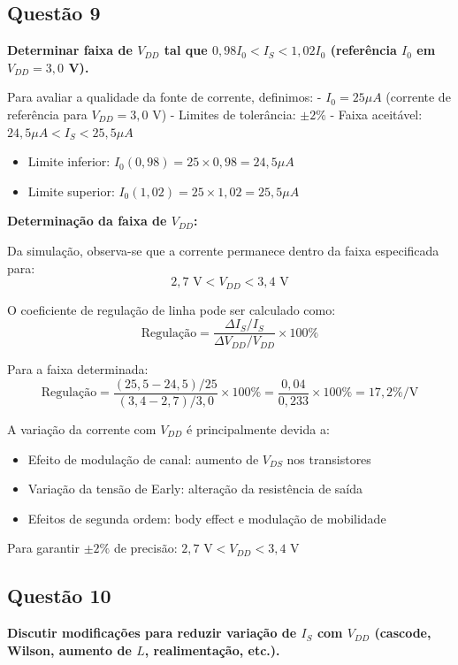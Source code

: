 ﻿\documentclass[12pt,a4paper]{article}
\begin{document}
\subsection*{Questão 9}
	\textbf{Determinar faixa de $V_{DD}$ tal que $0{,}98 I_0 < I_S < 1{,}02 I_0$ (referência $I_0$ em $V_{DD}=3{,}0$ V).}



Para avaliar a qualidade da fonte de corrente, definimos:
- $I_0 = 25 \mu A$ (corrente de referência para $V_{DD} = 3,0$ V)
- Limites de tolerância: $\pm 2\%$
- Faixa aceitável: $24,5 \mu A < I_S < 25,5 \mu A$


\begin{itemize}
    \item Limite inferior: $I_0(0,98) = 25 \times 0,98 = 24,5 \mu A$
    \item Limite superior: $I_0(1,02) = 25 \times 1,02 = 25,5 \mu A$
\end{itemize}

\textbf{Determinação da faixa de $V_{DD}$:}

Da simulação, observa-se que a corrente permanece dentro da faixa especificada para:
$$2,7 \text{ V} < V_{DD} < 3,4 \text{ V}$$



O coeficiente de regulação de linha pode ser calculado como:
$$\text{Regulação} = \frac{\Delta I_S / I_S}{\Delta V_{DD} / V_{DD}} \times 100\% $$

Para a faixa determinada:
$$\text{Regulação} = \frac{(25,5-24,5)/25}{(3,4-2,7)/3,0} \times 100\% = \frac{0,04}{0,233} \times 100\% = 17,2\%/\text{V}$$



A variação da corrente com $V_{DD}$ é principalmente devida a:
\begin{itemize}
    \item Efeito de modulação de canal: aumento de $V_{DS}$ nos transistores
    \item Variação da tensão de Early: alteração da resistência de saída
    \item Efeitos de segunda ordem: body effect e modulação de mobilidade
\end{itemize}



Para garantir $\pm 2\%$ de precisão: $\boxed{2,7 \text{ V} < V_{DD} < 3,4 \text{ V}}$

\subsection*{Questão 10}
	\textbf{Discutir modificações para reduzir variação de $I_S$ com $V_{DD}$ (cascode, Wilson, aumento de $L$, realimentação, etc.).}
\end{document}
